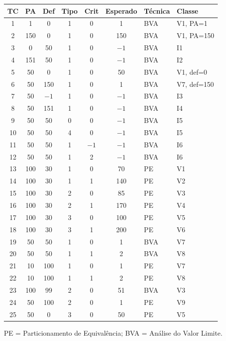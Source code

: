 \documentclass[12pt,a4paper]{article}
\begin{document}
\begin{tcolorbox}[colback=red!5, colframe=red!40, title=\textbf{Suíte de Testes Completa}, fonttitle=\small]
\small

\begin{center}
\begin{tabular}{ccccccll}
\toprule
\textbf{TC} & \textbf{PA} & \textbf{Def} & \textbf{Tipo} & \textbf{Crit} & \textbf{Esperado} & \textbf{Técnica} & \textbf{Classe} \\
\midrule
1  & 1   & 0   & 1 & 0 & 1    & BVA  & V1, PA=1 \\
2  & 150 & 0   & 1 & 0 & 150  & BVA  & V1, PA=150 \\
3  & 0   & 50  & 1 & 0 & $-1$ & BVA  & I1 \\
4  & 151 & 50  & 1 & 0 & $-1$ & BVA  & I2 \\
5  & 50  & 0   & 1 & 0 & 50   & BVA  & V1, def=0 \\
6  & 50  & 150 & 1 & 0 & 1    & BVA  & V7, def=150 \\
7  & 50  & $-1$& 1 & 0 & $-1$ & BVA  & I3 \\
8  & 50  & 151 & 1 & 0 & $-1$ & BVA  & I4 \\
9  & 50  & 50  & 0 & 0 & $-1$ & BVA  & I5 \\
10 & 50  & 50  & 4 & 0 & $-1$ & BVA  & I5 \\
11 & 50  & 50  & 1 & $-1$& $-1$& BVA  & I6 \\
12 & 50  & 50  & 1 & 2 & $-1$ & BVA  & I6 \\
\midrule
13 & 100 & 30  & 1 & 0 & 70   & PE   & V1 \\
14 & 100 & 30  & 1 & 1 & 140  & PE   & V2 \\
15 & 100 & 30  & 2 & 0 & 85   & PE   & V3 \\
16 & 100 & 30  & 2 & 1 & 170  & PE   & V4 \\
17 & 100 & 30  & 3 & 0 & 100  & PE   & V5 \\
18 & 100 & 30  & 3 & 1 & 200  & PE   & V6 \\
\midrule
19 & 50  & 50  & 1 & 0 & 1    & BVA  & V7 \\
20 & 50  & 50  & 1 & 1 & 2    & BVA  & V8 \\
21 & 10  & 100 & 1 & 0 & 1    & PE   & V7 \\
22 & 10  & 100 & 1 & 1 & 2    & PE   & V8 \\
23 & 100 & 99  & 2 & 0 & 51   & BVA  & V3 \\
24 & 50  & 100 & 2 & 0 & 1    & PE   & V9 \\
25 & 50  & 0   & 3 & 0 & 50   & PE   & V5 \\
\bottomrule
\end{tabular}
\end{center}

\small PE = Particionamento de Equivalência; BVA = Análise do Valor Limite.

\end{tcolorbox}
\end{document}
